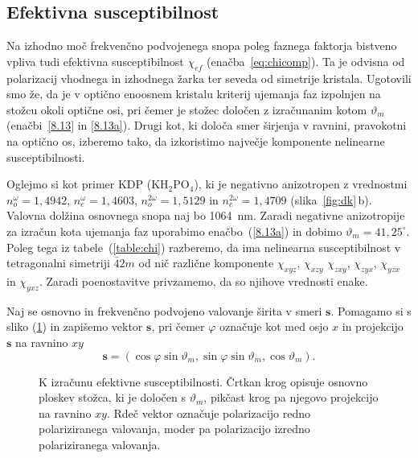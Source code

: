 \subsection*{Efektivna susceptibilnost}
Na izhodno moč frekvenčno podvojenega snopa poleg faznega faktorja bistveno vpliva tudi efektivna 
susceptibilnost $\chi_{ef}$ (enačba~\ref{eq:chicomp}). Ta je odvisna 
od polarizacij vhodnega in izhodnega žarka ter seveda od simetrije kristala. Ugotovili smo že, 
da je v optično enoosnem kristalu kriterij ujemanja faz izpolnjen na stožcu okoli 
optične osi, pri čemer je stožec določen 
z izračunanim kotom $\vartheta_m$ (enačbi~\ref{8.13} in \ref{8.13a}). 
Drugi kot, ki določa smer širjenja v ravnini, pravokotni na optično os, 
izberemo tako, da izkoristimo največje komponente nelinearne 
susceptibilnosti. 

Oglejmo si kot primer KDP (KH$_{2}$PO$_{4}$), ki je negativno anizotropen 
z vrednostmi $n_o^{\omega} = 1,4942$, 
$n_e^{\omega} = 1,4603$, $n_o^{2\omega} = 1,5129$ in $n_e^{2\omega} = 1,4709$
(slika~\ref{fig:dk}\,b). Valovna dolžina osnovnega snopa naj bo 1064~nm. 
Zaradi negativne anizotropije za izračun kota ujemanja faz 
uporabimo enačbo~(\ref{8.13a}) in dobimo $\vartheta_m = 41,25^\circ$. 
Poleg tega iz tabele~(\ref{table:chi}) razberemo, da ima nelinearna susceptibilnost v tetragonalni
simetriji $\bar{4}2m$ od nič različne komponente $\chi_{xyz}$, $\chi_{xzy}$
$\chi_{zxy}$, $\chi_{zyx}$, $\chi_{yzx}$ in $\chi_{yxz}$.
Zaradi poenostavitve privzamemo, da so njihove vrednosti enake. 

Naj se osnovno in frekvenčno podvojeno valovanje širita 
v smeri $\mathbf{s}$. Pomagamo si s sliko (\ref{fig:chi}) in zapišemo 
vektor $\mathbf{s}$, pri čemer $\varphi$ označuje kot med osjo $x$ in projekcijo 
$\mathbf{s}$ na ravnino $xy$
\begin{equation}
\mathbf{s}=(\cos\varphi\sin\vartheta_m,\sin\varphi\sin\vartheta_m,\cos\vartheta_m).
\label{8.14}
\end{equation}

\begin{figure}[h]
\centering
\def\svgwidth{80truemm} 

\caption{K izračunu efektivne susceptibilnosti. Črtkan krog opisuje osnovno ploskev
stožca, ki je določen s $\vartheta_m$, pikčast krog pa njegovo projekcijo
na ravnino $xy$. Rdeč vektor označuje polarizacijo redno polariziranega valovanja, 
moder pa polarizacijo izredno polariziranega valovanja.}
\label{fig:chi}
\end{figure}

